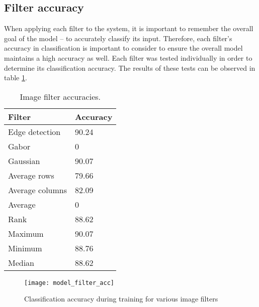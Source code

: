 	\subsection{Filter accuracy} \label{s:filters:accuracy}
		When applying each filter to the system, it is important to remember the overall goal of the model -- to accurately classify its input. Therefore, each filter's accuracy in classification is important to consider to ensure the overall model maintains a high accuracy as well. Each filter was tested individually in order to determine its classification accuracy. The results of these tests can be observed in table \ref{t:filterAccuracies}.
		\begin{table}
			\begin{center}
				\caption{Image filter accuracies.}
				\label{t:filterAccuracies}
				\begin{tabular}{l|l}\hline
					\textbf{Filter} & \textbf{Accuracy}\\\hline
					Edge detection & 90.24\\\hline
					Gabor & 0\\\hline
					Gaussian & 90.07\\\hline
					Average rows & 79.66\\\hline
					Average columns & 82.09\\\hline
					Average & 0\\\hline
					Rank & 88.62\\\hline
					Maximum & 90.07\\\hline
					Minimum & 88.76\\\hline
					Median & 88.62\\\hline
				\end{tabular}
			\end{center}
		\end{table}
		\begin{figure}
			\texttt{[image: model\_filter\_acc]}
			\caption{Classification accuracy during training for various image filters}
			\label{f:filters:accuracy}
		\end{figure}
